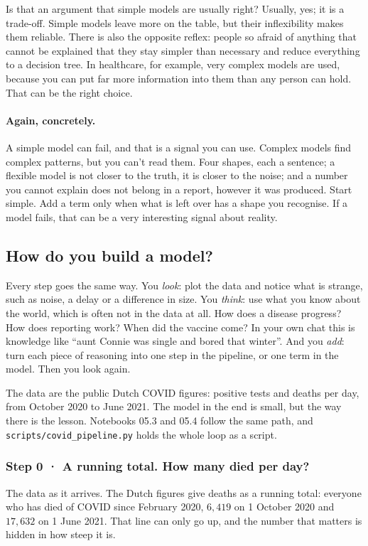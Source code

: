 \documentclass[12pt, a4paper]{article}
\theoremstyle{definition}
\theoremstyle{remark}
\newcommand{\againconcretely}{\paragraph{Again, concretely.}}
\begin{document}
Is that an argument that simple models are usually right? Usually, yes; it is a trade-off. Simple models leave more on the table, but their inflexibility makes them reliable. There is also the opposite reflex: people so afraid of anything that cannot be explained that they stay simpler than necessary and reduce everything to a decision tree. In healthcare, for example, very complex models are used, because you can put far more information into them than any person can hold. That can be the right choice.

\againconcretely
A simple model can fail, and that is a signal you can use. Complex models find complex patterns, but you can't read them. Four shapes, each a sentence; a flexible model is not closer to the truth, it is closer to the noise; and a number you cannot explain does not belong in a report, however it was produced. Start simple. Add a term only when what is left over has a shape you recognise. If a model fails, that can be a very interesting signal about reality.

\subsection{How do you build a model?}
\label{sec:building}
Every step goes the same way. You \emph{look}: plot the data and notice what is strange, such as noise, a delay or a difference in size. You \emph{think}: use what you know about the world, which is often not in the data at all. How does a disease progress? How does reporting work? When did the vaccine come? In your own chat this is knowledge like ``aunt Connie was single and bored that winter''. And you \emph{add}: turn each piece of reasoning into one step in the pipeline, or one term in the model. Then you look again.

The data are the public Dutch COVID figures: positive tests and deaths per day, from October 2020 to June 2021. The model in the end is small, but the way there is the lesson. Notebooks 05.3 and 05.4 follow the same path, and \texttt{scripts/covid\_pipeline.py} holds the whole loop as a script.

\subsubsection{\texorpdfstring{Step 0 · A running total. How many died per day?}{Step 0: A running total. How many died per day?}}
The data as it arrives. The Dutch figures give deaths as a running total: everyone who has died of COVID since February 2020, $6{,}419$ on 1 October 2020 and $17{,}632$ on 1 June 2021. That line can only go up, and the number that matters is hidden in how steep it is.
\end{document}
